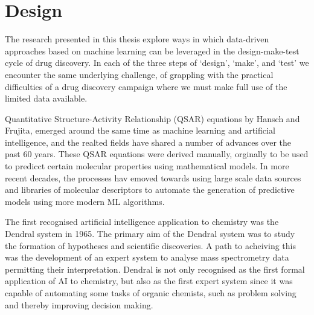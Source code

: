 \section*{Design}
The research presented in this thesis explore ways in which data-driven approaches based on machine learning can be leveraged in the design-make-test cycle of drug discovery. In each of the three steps of `design', `make', and `test' we encounter the same underlying challenge, of grappling with the practical difficulties of a drug discovery campaign where we must make full use of the limited data available.




Quantitative Structure-Activity Relationship (QSAR) equations by Hansch and Frujita, emerged around the same time as machine learning and artificial intelligence, and the realted fields have shared a number of advances over the past 60 years. These QSAR equations were derived manually, orginally to be used to predicct certain molecular properties using mathematical models. In more recent decades, the processes hav emoved towards using large scale data sources and libraries of molecular descriptors to automate the generation of predictive models using more modern ML algorithms. 

The first recognised artificial intelligence application to chemistry was the Dendral system in 1965. The primary aim of the Dendral system was to study the formation of hypotheses and scientific discoveries. A path to acheiving this was the development of an expert system to analyse mass spectrometry data permitting their interpretation. Dendral is not only recognised as the first formal application of AI to chemistry, but also as the first expert system since it was capable of automating some tasks of organic chemists, such as problem solving and thereby improving decision making. 

